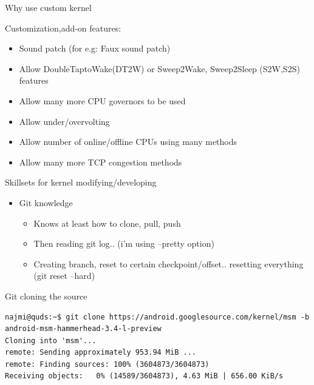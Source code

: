 \documentclass{beamer}
\begin{document}
\begin{frame}{Why use custom kernel}
 
 Customization,add-on features:

 \begin{itemize}
  \item \pause Sound patch (for e.g: Faux sound patch)
  \item \pause Allow DoubleTaptoWake(DT2W) or Sweep2Wake, Sweep2Sleep (S2W,S2S) features
  \item \pause Allow many more CPU governors to be used
  \item \pause Allow under/overvolting
  \item \pause Allow number of online/offline CPUs using many methods
  \item \pause Allow many more TCP congestion methods
 \end{itemize}
  
\end{frame}

\begin{frame}{Skillsets for kernel modifying/developing}
\begin{itemize}
 \item Git knowledge
 \begin{itemize}
  \item Knows at least how to clone, pull, push
  \item Then reading git log.. (i'm using --pretty option)
  \item Creating branch, reset to certain checkpoint/offset.. resetting everything (git reset --hard)
 \end{itemize}

 
\end{itemize}

 
\end{frame}

\begin{frame}[fragile]{Git cloning the source}
 \tiny{\begin{verbatim}
najmi@quds:~$ git clone https://android.googlesource.com/kernel/msm -b android-msm-hammerhead-3.4-l-preview
Cloning into 'msm'...
remote: Sending approximately 953.94 MiB ...
remote: Finding sources: 100% (3604873/3604873)
Receiving objects:   0% (14589/3604873), 4.63 MiB | 656.00 KiB/s
 \end{verbatim}}
\end{frame}
\end{document}
